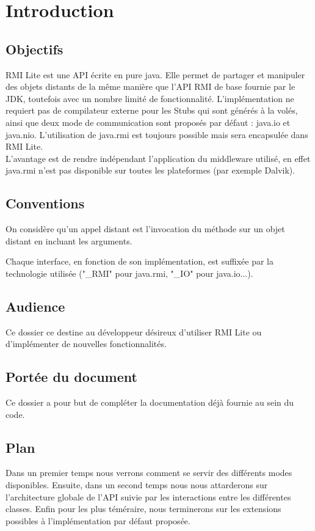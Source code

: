 \chapter{Introduction}

\section{Objectifs}

RMI Lite est une API écrite en pure java. Elle permet de partager et manipuler des objets distants de la même manière que l'API RMI de base fournie par le JDK, toutefois avec un nombre limité de fonctionnalité. L'implémentation ne requiert pas de compilateur externe pour les Stubs qui sont générés à la volés, ainsi que deux mode de communication sont proposés par défaut : java.io et java.nio. L'utilisation de java.rmi est toujours possible mais sera encapsulée dans RMI Lite.\\

L'avantage est de rendre indépendant l'application du middleware utilisé, en effet java.rmi n'est pas disponible sur toutes les plateformes (par exemple Dalvik).

\section{Conventions}
On considère qu'un appel distant est l'invocation du méthode sur un objet distant en incluant les arguments.
\medskip

Chaque interface, en fonction de son implémentation, est suffixée par la technologie utilisée ("\_RMI" pour java.rmi, "\_IO" pour java.io...).

\section{Audience}
Ce dossier ce destine au développeur désireux d'utiliser RMI Lite ou d'implémenter de nouvelles fonctionnalités.

\section{Portée du document}
Ce dossier a pour but de compléter la documentation déjà fournie au sein du code.

\section{Plan}
Dans un premier temps nous verrons comment se servir des différents modes disponibles. Ensuite, dans un second temps nous nous attarderons sur l'architecture globale de l'API suivie par les interactions entre les différentes classes. Enfin pour les plus téméraire, nous terminerons sur les extensions possibles à l'implémentation par défaut proposée.

